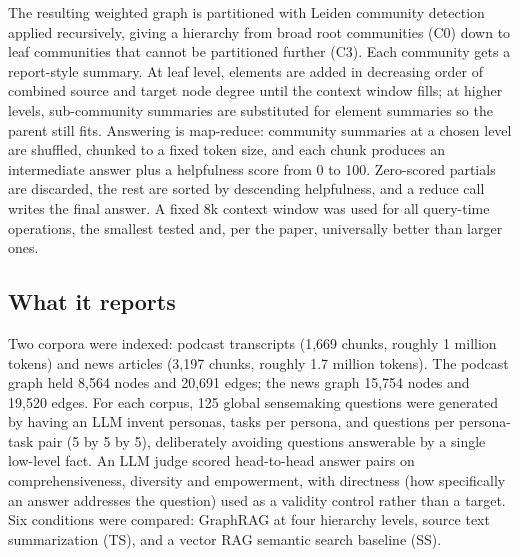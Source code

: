The resulting weighted graph is partitioned with Leiden community detection applied recursively, giving a hierarchy from broad root communities (C0) down to leaf communities that cannot be partitioned further (C3). Each community gets a report-style summary. At leaf level, elements are added in decreasing order of combined source and target node degree until the context window fills; at higher levels, sub-community summaries are substituted for element summaries so the parent still fits. Answering is map-reduce: community summaries at a chosen level are shuffled, chunked to a fixed token size, and each chunk produces an intermediate answer plus a helpfulness score from 0 to 100. Zero-scored partials are discarded, the rest are sorted by descending helpfulness, and a reduce call writes the final answer. A fixed 8k context window was used for all query-time operations, the smallest tested and, per the paper, universally better than larger ones.

\begin{center}
\end{center}

\subsection{What it reports}

Two corpora were indexed: podcast transcripts (1,669 chunks, roughly 1 million tokens) and news articles (3,197 chunks, roughly 1.7 million tokens). The podcast graph held 8,564 nodes and 20,691 edges; the news graph 15,754 nodes and 19,520 edges. For each corpus, 125 global sensemaking questions were generated by having an LLM invent personas, tasks per persona, and questions per persona-task pair (5 by 5 by 5), deliberately avoiding questions answerable by a single low-level fact. An LLM judge scored head-to-head answer pairs on comprehensiveness, diversity and empowerment, with directness (how specifically an answer addresses the question) used as a validity control rather than a target. Six conditions were compared: GraphRAG at four hierarchy levels, source text summarization (TS), and a vector RAG semantic search baseline (SS).

